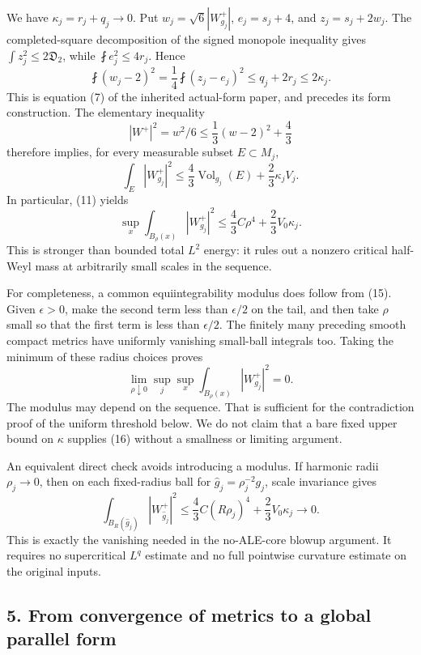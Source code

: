 \documentclass[
  11pt,
]{article}
\begin{document}
We have \(\kappa_j=r_j+q_j\to0\). Put \(w_j=\sqrt6|W^+_{g_j}|\),
\(e_j=s_j+4\), and \(z_j=s_j+2w_j\). The completed-square decomposition
of the signed monopole inequality gives \(\int z_j^2\le2\mathfrak D_2\),
while \(\fint e_j^2\le4r_j\). Hence \[
 \fint(w_j-2)^2
    =\frac14\fint(z_j-e_j)^2
    \le q_j+2r_j\le2\kappa_j.
 \tag{12}
\] This is equation (7) of the inherited actual-form paper, and precedes
its form construction. The elementary inequality \[
             |W^+|^2=w^2/6\le\frac13(w-2)^2+\frac43
 \tag{13}
\] therefore implies, for every measurable subset \(E\subset M_j\), \[
 \int_E|W^+_{g_j}|^2
          \le\frac43\operatorname{Vol}_{g_j}(E)
                            +\frac23\kappa_jV_j.
 \tag{14}
\] In particular, (11) yields \[
 \sup_x\int_{B_\rho(x)}|W^+_{g_j}|^2
       \le\frac43C\rho^4+\frac23V_0\kappa_j.
 \tag{15}
\] This is stronger than bounded total \(L^2\) energy: it rules out a
nonzero critical half-Weyl mass at arbitrarily small scales in the
sequence.

For completeness, a common equiintegrability modulus does follow from
(15). Given \(\epsilon>0\), make the second term less than
\(\epsilon/2\) on the tail, and then take \(\rho\) small so that the
first term is less than \(\epsilon/2\). The finitely many preceding
smooth compact metrics have uniformly vanishing small-ball integrals
too. Taking the minimum of these radius choices proves \[
 \lim_{\rho\downarrow0}\sup_j\sup_x
           \int_{B_\rho(x)}|W^+_{g_j}|^2=0.
 \tag{16}
\] The modulus may depend on the sequence. That is sufficient for the
contradiction proof of the uniform threshold below. We do not claim that
a bare fixed upper bound on \(\kappa\) supplies (16) without a smallness
or limiting argument.

An equivalent direct check avoids introducing a modulus. If harmonic
radii \(\rho_j\to0\), then on each fixed-radius ball for
\(\widehat g_j=\rho_j^{-2}g_j\), scale invariance gives \[
 \int_{B_R(\widehat g_j)}|W^+_{\widehat g_j}|^2
 \le\frac43C(R\rho_j)^4+\frac23V_0\kappa_j\longrightarrow0.
 \tag{17}
\] This is exactly the vanishing needed in the no-ALE-core blowup
argument. It requires no supercritical \(L^q\) estimate and no full
pointwise curvature estimate on the original inputs.

\hypertarget{from-convergence-of-metrics-to-a-global-parallel-form}{%
\subsection{5. From convergence of metrics to a global parallel
form}\label{from-convergence-of-metrics-to-a-global-parallel-form}}
\end{document}
